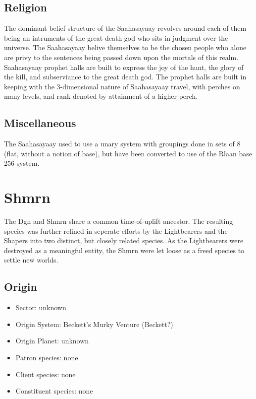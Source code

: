 \subsection{Religion}
The dominant belief structure of the Saahasayaay revolves around each
of them being an intruments of the great death god who sits in
judgment over the universe. The Saahasayaay belive themselves to be
the chosen people who alone are privy to the sentences being passed
down upon the mortals of this realm. Saahasayaay prophet halls are
built to express the joy of the hunt, the glory of the kill, and
subserviance to the great death god. The prophet halls are built in
keeping with the 3-dimensional nature of Saahasayaay travel, with
perches on many levels, and rank denoted by attainment of a higher
perch.

\subsection{Miscellaneous}
The Saahasayaay used to use a unary system with groupings done in sets
of 8 (flat, without a notion of base), but have been converted to use
of the Rlaan base 256 system.

\section{Shmrn}

\label{subsec:Shmrn-species}
The Dgn and Shmrn share a common time-of-uplift ancestor. The
resulting species was further refined in seperate efforts by the
Lightbearers and the Shapers into two distinct, but closely related
species. As the Lightbearers were destroyed as a meaningful entity,
the Shmrn were let loose as a freed species to settle new worlds.

\subsection{Origin}
\begin{itemize}
\item Sector: unknown
\item Origin System: Beckett's Murky Venture (Beckett?)
\item Origin Planet: unknown
\item Patron species: none
\item Client species: none
\item Constituent species: none 
\end{itemize}

